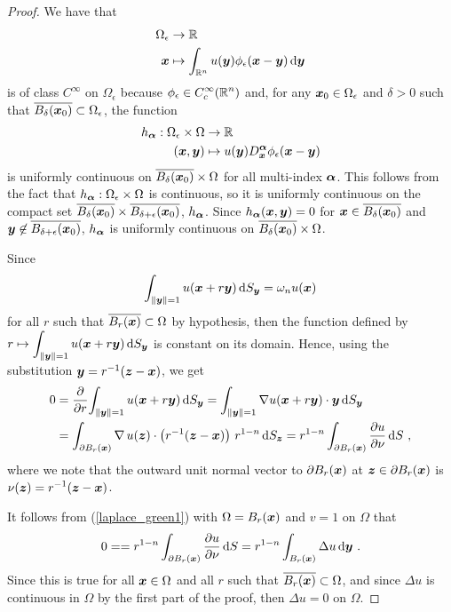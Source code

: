 \begin{proof}
We have that
\begin{align*}
\Omega_\epsilon & \rightarrow \RR \\
\VEC{x} & \mapsto
\int_{\RR^n} u(\VEC{y}) \phi_\epsilon(\VEC{x}-\VEC{y}) \dx{\VEC{y}}
\end{align*}
is of class $\displaystyle C^\infty$ on $\Omega_\epsilon$ because
$\displaystyle \phi_\epsilon \in C_c^\infty(\RR^n)$ and, for any
$\VEC{x}_0 \in \Omega_\epsilon$ and $\delta>0$ such that
$\overline{B_\delta(\VEC{x}_0)} \subset \Omega_\epsilon$, the function
\begin{align*}
h_{\VEC{\alpha}}: \Omega_\epsilon \times \Omega &\rightarrow \RR \\
(\VEC{x},\VEC{y}) &\mapsto u(\VEC{y})D^{\VEC{\alpha}}_{\VEC{x}}
\phi_\epsilon(\VEC{x}-\VEC{y})
\end{align*}
is uniformly continuous on
$\overline{B_\delta(\VEC{x}_0)} \times \Omega$ for all
multi-index $\VEC{\alpha}$.  This follows from the
fact that $h_{\VEC{\alpha}}:\Omega_\epsilon \times \Omega$ is
continuous, so it is uniformly continuous on the compact set
$\displaystyle \overline{B_\delta(\VEC{x}_0)} \times
\overline{B_{\delta+\epsilon}(\VEC{x}_0)}$, $h_{\VEC{\alpha}}$.  Since
$h_{\VEC{\alpha}}(\VEC{x},\VEC{y}) = 0$ for
$\VEC{x} \in \overline{B_{\delta}(\VEC{x}_0)}$ and
$\VEC{y} \not\in \overline{B_{\delta+\epsilon}(\VEC{x}_0)}$,
$h_{\VEC{\alpha}}$ is uniformly continuous on
$\overline{B_\delta(\VEC{x}_0)} \times \Omega$.

 Since
\[
\int_{\|\VEC{y}\|=1} u(\VEC{x}+r\VEC{y}) \dss{S}{y} = \omega_n u(\VEC{x})
\]
for all $r$ such that $\overline{B_r(\VEC{x})} \subset \Omega$ by hypothesis,
then the function defined by\\
$\displaystyle r \mapsto \int_{\|\VEC{y}\|=1} u(\VEC{x}+r\VEC{y}) \dss{S}{y}$
is constant on its domain.  Hence, using the substitution
$\VEC{y} = r^{-1} (\VEC{z}-\VEC{x})$, we get
\begin{align*}
0 &= \pdfdx{ \int_{\|\VEC{y}\|=1} u(\VEC{x}+r\VEC{y}) \dss{S}{y} }{r}
= \int_{\|\VEC{y}\|=1} \nabla u(\VEC{x}+r\VEC{y}) \cdot \VEC{y}
 \dss{S}{y} \\
&= \int_{\partial B_r(\VEC{x})} \graD u(\VEC{z}) \cdot \left(
  r^{-1} (\VEC{z} - \VEC{x}) \right) \, r^{1-n} \dss{S}{z}
= r^{1-n} \int_{\partial B_r(\VEC{x})} \pdydx{u}{\nu} \dx{S} \ ,
\end{align*}
where we note that the outward unit normal vector to $\partial B_r(\VEC{x})$
at $\VEC{z} \in \partial B_r(\VEC{x})$ is
$\displaystyle \nu(\VEC{z}) = r^{-1}(\VEC{z}-\VEC{x})$.

It follows from (\ref{laplace_green1}) with $\Omega = B_r(\VEC{x})$
and $v=1$ on $\Omega$ that
\[
0 = = r^{1-n} \int_{\partial B_r(\VEC{x})} \pdydx{u}{\nu} \dx{S}
= r^{1-n} \int_{B_r(\VEC{x})} \Delta u \dx{\VEC{y}} \ .
\]
Since this is true for all $\VEC{x} \in \Omega$ and
all $r$ such that $\overline{B_r(\VEC{x})} \subset \Omega$, and since
$\Delta u$ is continuous in $\Omega$ by the first part of the proof, then
$\Delta u = 0$ on $\Omega$.
\end{proof}

